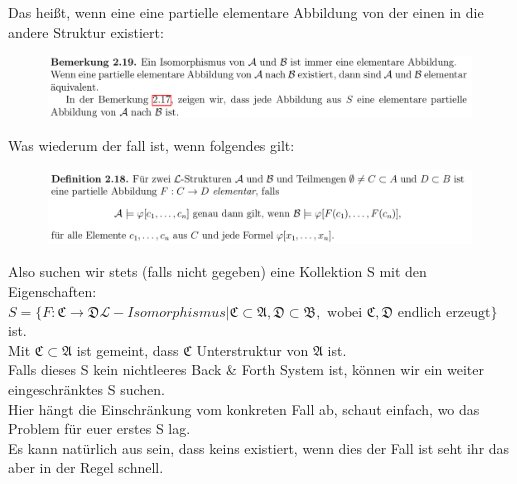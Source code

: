 \documentclass[a4paper]{scrartcl}
\begin{document}
    Das heißt, wenn eine eine partielle elementare Abbildung von der einen in die andere Struktur existiert:
    
    \begin{figure}[H]
        \centering
        \includegraphics[scale=0.3]{./B&F-PEA.png}
        \label{fig:}
    \end{figure}

    Was wiederum der fall ist, wenn folgendes gilt:

    \begin{figure}[H]
        \centering
        \includegraphics[scale=0.3]{./B&F-E.png}
        \label{fig:}
    \end{figure}

    Also suchen wir stets (falls nicht gegeben) eine Kollektion S mit den Eigenschaften:\\

    $S = \{F: \mathfrak{C} \rightarrow \mathfrak{D} \mathscr{L}-Isomorphismus| \mathfrak{C} \subset \mathfrak{A}, \mathfrak{D} \subset \mathfrak{B},
    \text{ wobei  }\mathfrak{C}, \mathfrak{D} \text{ endlich erzeugt}\}$ ist.\\
    Mit $\mathfrak{C} \subset \mathfrak{A}$ ist gemeint, dass $\mathfrak{C}$ Unterstruktur von $\mathfrak{A}$ ist.\\

    Falls dieses S kein nichtleeres Back \& Forth System ist, können wir ein weiter eingeschränktes S suchen.\\
    Hier hängt die Einschränkung vom konkreten Fall ab, schaut einfach, wo das Problem für euer erstes S lag.\\
    Es kann natürlich aus sein, dass keins existiert, wenn dies der Fall ist seht ihr das aber in der Regel schnell.\\
\end{document}
